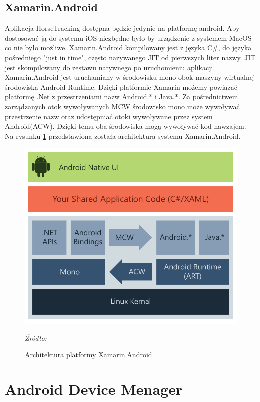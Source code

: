 \documentclass[12pt,twoside]{report}
\begin{document}
\subsection{Xamarin.Android}
Aplikacja HorseTracking dostępna będzie jedynie na platformę android. Aby dostosować ją do systemu iOS niezbędne było by urządzenie z systemem MacOS co nie było możliwe.
Xamarin.Android kompilowany jest z języka C\#, do języka pośredniego "just in time", często nazywanego JIT od pierwszych liter nazwy. JIT jest skompilowany do zestawu natywnego po uruchomieniu aplikacji. Xamarin.Android jest uruchamiany w środowisku mono obok maszyny wirtualnej środowiska Android Runtime. Dzięki platformie Xamarin możemy powiązać platformę .Net z przestrzeniami nazw Android.* i Java.*. Za pośrednictwem zarządzanych otok wywoływanych MCW środowisko mono może wywoływać przestrzenie nazw oraz udostępniać otoki wywoływane przez system Android(ACW). Dzięki temu oba środowiska mogą wywoływać kod nawzajem. Na rysunku \ref{AndroidArchitecture} przedstawiona została architektura systemu Xamarin.Android\cite{XamarinLearn}.
\begin{figure}[H]
	\centering
	\includegraphics[scale=0.3]{androidArchitecture}
	\caption{Architektura platformy Xamarin.Android}
	\textit{Źródło: \cite{XamarinLearn}}
	\label{AndroidArchitecture}
\end{figure}

\section{Android Device Menager}
\end{document}
